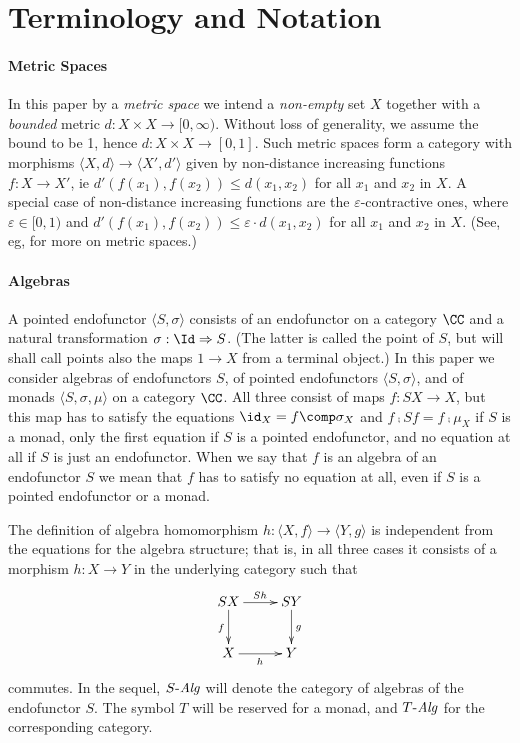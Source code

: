 \documentclass[11pt,a4paper]{article}
\newcommand{\tuple}[1]{\langle #1 \rangle }
\renewcommand{\alg}[1]{#1 \mbox{-\textit{Alg}}}
\newcommand{\efunctor}{S}
\newcommand{\contr}{\sigma}
\newcommand{\pointedfunctor}{\tuple{\efunctor , \contr}}
\newcommand{\esse}{S}
\begin{document}
\section{Terminology and Notation}

\paragraph{Metric Spaces}
In this paper by a \emph{metric space} we
intend a \emph{non-empty} set $X$ together with
a \emph{bounded} metric $d: X\times X \rightarrow [0,\infty )$.
Without loss of generality, we assume the
bound to be 1, hence $d: X\times X \rightarrow [0,1]$.
Such metric spaces form a category
with morphisms 
$\tuple{X,d}\rightarrow \tuple{X',d'}$
given by non-distance increasing functions
$f:X\rightarrow X'$, ie
$d' (f(x_1 ) ,f(x_2 ))\leq d(x_1 ,x_2 )$
for all $x_1$ and $x_2$ in $X$.
A special case of non-distance increasing functions
are the $\varepsilon$-contractive ones,
where $\varepsilon \in [0,1)$ and
$d' (f(x_1 ) ,f(x_2 ))\leq \varepsilon \cdot d(x_1 ,x_2 )$
for all $x_1$ and $x_2$ in $X$.
(See, eg, \cite{Dugu} for more on metric spaces.)

\paragraph{Algebras}
A pointed endofunctor $\pointedfunctor$ 
consists of an endofunctor on a category $\CC$
and a natural transformation $\sigma : \Id \Rightarrow S$.
(The latter is called the point of $S$, but will shall call
points also the maps $1\rightarrow X$ from a terminal object.)
In this paper we consider algebras of endofunctors $S$,
of pointed endofunctors $\tuple{S,\sigma}$,
and of monads $\tuple{S,\sigma ,\mu}$ on a category $\CC$.
All three consist of maps $f:SX\rightarrow X$,
but this map has to satisfy the equations
$\id_X = f \comp \sigma_X$ and $f\comp Sf = f \comp \mu_X$
if $S$ is a monad, only the first equation if $S$ is
a pointed endofunctor, and no equation at all if $S$
is just an endofunctor.
When we say that $f$ is an algebra of an endofunctor $S$
we mean that $f$ has to satisfy no equation at all,
even if $S$ is a pointed endofunctor or a monad.

The definition of algebra homomorphism 
$h :\tuple{X,f} \rightarrow \tuple{Y,g}$
is independent from
the equations for the algebra structure;
that is, in all three cases it consists of a morphism
$h: X \rightarrow Y$ in the underlying category
such that
$$\xymatrix{
\esse X \ar[d]_{f} \ar[r]^{\esse h} 
     & \esse Y\ar[d]^{g}
\\
X \ar[r]_h &  Y
}$$
commutes.
In the sequel, $\alg{S}$ 
will denote the category of
algebras of the endofunctor $S$.
The symbol $T$ will be reserved for a monad,
and $\alg{T}$ for the corresponding category.
\end{document}
